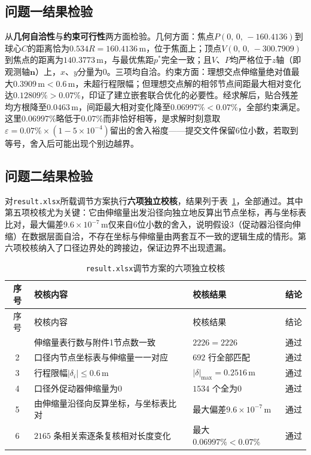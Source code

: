 \documentclass[withoutpreface]{cumcmthesis}
\begin{document}
\subsection{问题一结果检验}

从\textbf{几何自洽性}与\textbf{约束可行性}两方面检验。几何方面：焦点$P(0,\,0,\,-160.4136)$到球心$C$的距离恰为$0.534R=160.4136\,\mathrm{m}$，位于焦面上；顶点$V(0,\,0,\,-300.7909)$到焦点的距离为$140.3773\,\mathrm{m}$，与最优焦距$p^{*}$完全一致；且$V$、$P$均严格位于$z$轴（即观测轴$\mathbf{n}$）上，$x$、$y$分量为$0$。三项均自洽。约束方面：理想交点伸缩量绝对值最大$0.3909\,\mathrm{m}<0.6\,\mathrm{m}$，未超行程限幅；但理想交点解的相邻节点间距最大相对变化达$0.12809\%>0.07\%$，印证了建立嵌套联合优化的必要性。经求解后，贴合残差均方根降至$0.0463\,\mathrm{m}$，间距最大相对变化降至$0.06997\%<0.07\%$，全部约束满足。这里$0.06997\%$略低于$0.07\%$而非恰好相等，是求解时刻意取$\varepsilon=0.07\%\times(1-5\times10^{-4})$留出的舍入裕度——提交文件保留$6$位小数，若取到等号，舍入后可能出现个别边越界。

\subsection{问题二结果检验}\label{sec:verify}

对\texttt{result.xlsx}所载调节方案执行\textbf{六项独立校核}，结果列于表~\ref{tab:verify}，全部通过。其中第五项校核尤为关键：它由伸缩量出发沿径向独立地反算出节点坐标，再与坐标表比对，最大偏差$9.6\times10^{-7}\,\mathrm{m}$仅来自$6$位小数的舍入，说明假设3（促动器沿径向伸缩）在数据层面自洽，不存在坐标与伸缩量由两套互不一致的逻辑生成的情形。第六项校核纳入了口径边界处的跨接边，保证边界不出现遗漏。

\begin{longtable}{c p{6.6cm} p{3.0cm} p{2.4cm}}
\caption{\texttt{result.xlsx}调节方案的六项独立校核} \label{tab:verify} \\
\toprule
序号 & 校核内容 & 校核结果 & 结论 \\
\midrule
\endfirsthead
\toprule
序号 & 校核内容 & 校核结果 & 结论 \\
\midrule
\endhead
\bottomrule
\endfoot
\bottomrule
\endlastfoot
1 & 伸缩量表行数与附件1节点数一致 & $2226=2226$ & 通过 \\
2 & 口径内节点坐标表与伸缩量一一对应 & $692$ 行全部匹配 & 通过 \\
3 & 行程限幅$|\delta_i|\le0.6\,\mathrm{m}$ & $|\delta|_{\max}=0.2516\,\mathrm{m}$ & 通过 \\
4 & 口径外促动器伸缩量为$0$ & $1534$ 个全为$0$ & 通过 \\
5 & 由伸缩量沿径向反算坐标，与坐标表比对 & 最大偏差$9.6\times10^{-7}\,\mathrm{m}$ & 通过 \\
6 & $2165$ 条相关索逐条复核相对长度变化 & 最大$0.06997\%<0.07\%$ & 通过 \\
\bottomrule
\end{longtable}
\end{document}

